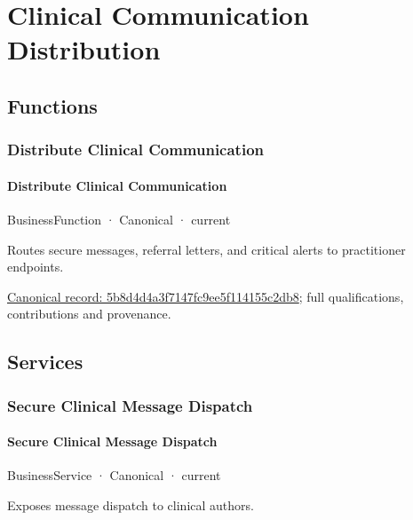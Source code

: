 \section{Clinical Communication Distribution}

\subsection{Functions}

\subsubsection{Distribute Clinical Communication}

\paragraph{Distribute Clinical Communication}

\label{element:5b8d4d4a3f7147fc9ee5f114155c2db8}
{\small BusinessFunction · Canonical · current}\par

Routes secure messages, referral letters, and critical alerts to practitioner endpoints.


{\footnotesize \href{../../../../continuum/business/business-function/5b8d4d4a3f7147fc9ee5f114155c2db8.md}{Canonical record: 5b8d4d4a3f7147fc9ee5f114155c2db8}; full qualifications, contributions and provenance.}\par
\subsection{Services}

\subsubsection{Secure Clinical Message Dispatch}

\paragraph{Secure Clinical Message Dispatch}

\label{element:d28fb3b4123b4e569a95a823fd83f837}
{\small BusinessService · Canonical · current}\par

Exposes message dispatch to clinical authors.


